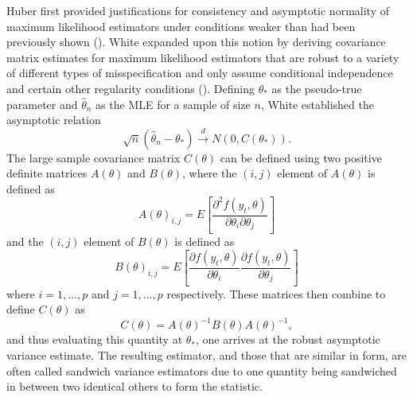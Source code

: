 \documentclass[12pt]{article} %
\theoremstyle{definition}
\begin{document}
		Huber first provided justifications for consistency and asymptotic normality of maximum likelihood estimators under conditions weaker than had been previously shown (\cite{Huber}). White
		expanded upon this notion by deriving covariance matrix estimates for maximum likelihood estimators that are robust to a variety of different types of misspecification and only assume
		conditional independence and certain other regularity conditions (\cite{White1980}). Defining $\theta_*$ as the pseudo-true parameter and $\hat{\theta}_n$ as the MLE for a sample of size
		$n$, White established the asymptotic relation
		\begin{equation*}
			\sqrt{n} (\hat{\theta}_n - \theta_*) \xrightarrow[]{d} N(0, C(\theta_* ) ) .
		\end{equation*}
		The large sample covariance matrix $C(\theta)$ can be defined using two positive definite matrices $A(\theta)$ and $B(\theta)$, where the $(i,j)$ element of $A(\theta)$ is defined as
		\begin{equation*}
			A(\theta)_{i,j} = E \left[ \frac{\partial^2 f(y_t,\theta)}{\partial \theta_i \partial \theta_j} \right] 
		\end{equation*}
		and the $(i,j)$ element of $B(\theta)$ is defined as
		\begin{equation*}
			B(\theta)_{i,j} = E \left[ \frac{\partial f(y_t,\theta)}{\partial \theta_i} \frac{\partial f(y_t,\theta)}{\partial \theta_j} \right] 
		\end{equation*}
		where $i = 1,...,p$ and $j = 1,...,p$ respectively. These matrices then combine to define $C(\theta)$ as
		\begin{equation*}
			C(\theta) = A(\theta)^{-1} B(\theta) A(\theta)^{-1} ,
		\end{equation*}
		and thus evaluating this quantity at $\theta_*$, one arrives at the robust asymptotic variance estimate. The resulting estimator, and those that are similar in form, are often called sandwich
		variance estimators due to one quantity being sandwiched in between two identical others to form the statistic.
\end{document}
